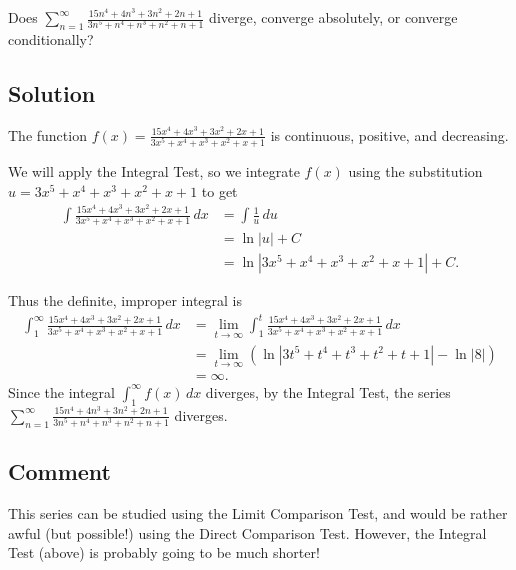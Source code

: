 \documentclass{article}
\begin{document}
\noindent
Does $\displaystyle \sum_{n=1}^\infty \frac{15n^4+4n^3+3n^2+2n+1}{3n^5+n^4+n^3+n^2+n+1}$
diverge, converge absolutely, or converge conditionally?

\subsection*{Solution}

The function $\displaystyle f(x)=\frac{15x^4+4x^3+3x^2+2x+1}{3x^5+x^4+x^3+x^2+x+1}$ is continuous, positive, and decreasing.

We will apply the Integral Test, so we integrate $f(x)$ using the substitution $u=3x^5+x^4+x^3+x^2+x+1$ to get
\begin{align*}
\int \frac{15x^4+4x^3+3x^2+2x+1}{3x^5+x^4+x^3+x^2+x+1}\,dx 
&= \int \frac1u\,du\\
&= \ln|u|+C\\
&= \ln|3x^5+x^4+x^3+x^2+x+1|+C.
\end{align*}

Thus the definite, improper integral is
\begin{align*}
\int_1^\infty  \frac{15x^4+4x^3+3x^2+2x+1}{3x^5+x^4+x^3+x^2+x+1}\,dx 
&= \lim_{t \to \infty} \int_1^t  \frac{15x^4+4x^3+3x^2+2x+1}{3x^5+x^4+x^3+x^2+x+1}\,dx \\
&= \lim_{t \to \infty} ( \ln|3t^5+t^4+t^3+t^2+t+1| -  \ln|8|)\\
&= \infty.
\end{align*}
Since the integral $\displaystyle \int_1^\infty f(x)\,dx$ diverges, by the Integral Test, the series $\displaystyle \sum_{n=1}^\infty \frac{15n^4+4n^3+3n^2+2n+1}{3n^5+n^4+n^3+n^2+n+1}$ diverges.

\subsection*{Comment}

This series can be studied using the Limit Comparison Test, and would be rather awful (but possible!) using the Direct Comparison Test. However, the Integral Test (above) is probably going to be much shorter!
\end{document}
